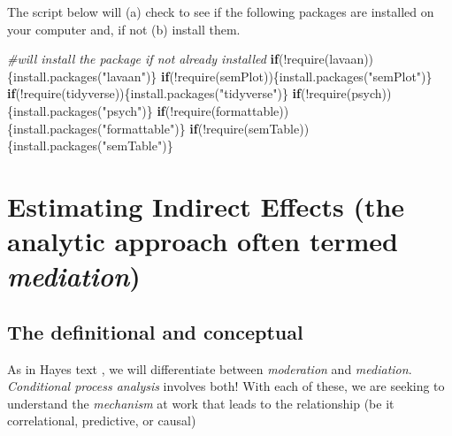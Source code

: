 \documentclass[
  11pt,
]{book}
\newenvironment{Shaded}{\begin{snugshade}}{\end{snugshade}}
\newcommand{\CommentTok}[1]{\textcolor[rgb]{0.56,0.35,0.01}{\textit{#1}}}
\newcommand{\ControlFlowTok}[1]{\textcolor[rgb]{0.13,0.29,0.53}{\textbf{#1}}}
\newcommand{\FunctionTok}[1]{\textcolor[rgb]{0.00,0.00,0.00}{#1}}
\newcommand{\NormalTok}[1]{#1}
\newcommand{\SpecialCharTok}[1]{\textcolor[rgb]{0.00,0.00,0.00}{#1}}
\newcommand{\StringTok}[1]{\textcolor[rgb]{0.31,0.60,0.02}{#1}}
\begin{document}
The script below will (a) check to see if the following packages are installed on your computer and, if not (b) install them.

\begin{Shaded}
\begin{Highlighting}[]
\CommentTok{\#will install the package if not already installed}
\ControlFlowTok{if}\NormalTok{(}\SpecialCharTok{!}\FunctionTok{require}\NormalTok{(lavaan))\{}\FunctionTok{install.packages}\NormalTok{(}\StringTok{"lavaan"}\NormalTok{)\}}
\ControlFlowTok{if}\NormalTok{(}\SpecialCharTok{!}\FunctionTok{require}\NormalTok{(semPlot))\{}\FunctionTok{install.packages}\NormalTok{(}\StringTok{"semPlot"}\NormalTok{)\}}
\ControlFlowTok{if}\NormalTok{(}\SpecialCharTok{!}\FunctionTok{require}\NormalTok{(tidyverse))\{}\FunctionTok{install.packages}\NormalTok{(}\StringTok{"tidyverse"}\NormalTok{)\}}
\ControlFlowTok{if}\NormalTok{(}\SpecialCharTok{!}\FunctionTok{require}\NormalTok{(psych))\{}\FunctionTok{install.packages}\NormalTok{(}\StringTok{"psych"}\NormalTok{)\}}
\ControlFlowTok{if}\NormalTok{(}\SpecialCharTok{!}\FunctionTok{require}\NormalTok{(formattable))\{}\FunctionTok{install.packages}\NormalTok{(}\StringTok{"formattable"}\NormalTok{)\}}
\ControlFlowTok{if}\NormalTok{(}\SpecialCharTok{!}\FunctionTok{require}\NormalTok{(semTable))\{}\FunctionTok{install.packages}\NormalTok{(}\StringTok{"semTable"}\NormalTok{)\}}
\end{Highlighting}
\end{Shaded}

\hypertarget{estimating-indirect-effects-the-analytic-approach-often-termed-mediation}{%
\section{\texorpdfstring{Estimating Indirect Effects (the analytic approach often termed \emph{mediation})}{Estimating Indirect Effects (the analytic approach often termed mediation)}}\label{estimating-indirect-effects-the-analytic-approach-often-termed-mediation}}

\hypertarget{the-definitional-and-conceptual}{%
\subsection{The definitional and conceptual}\label{the-definitional-and-conceptual}}

As in Hayes text \citeyearpar{hayes_introduction_2018}, we will differentiate between \emph{moderation} and \emph{mediation}. \emph{Conditional process analysis} involves both! With each of these, we are seeking to understand the \emph{mechanism} at work that leads to the relationship (be it correlational, predictive, or causal)
\end{document}
